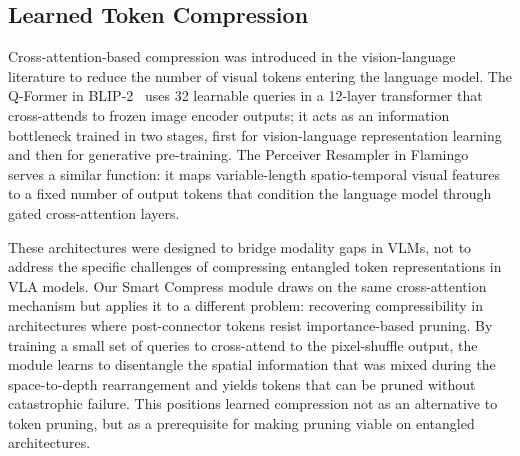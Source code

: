 \subsection{Learned Token Compression}

Cross-attention-based compression was introduced in the vision-language literature to reduce the number of visual tokens entering the language model. The Q-Former in BLIP-2~\cite{li2023blip2} uses 32 learnable queries in a 12-layer transformer that cross-attends to frozen image encoder outputs; it acts as an information bottleneck trained in two stages, first for vision-language representation learning and then for generative pre-training. The Perceiver Resampler in Flamingo~\cite{alayrac2022flamingo} serves a similar function: it maps variable-length spatio-temporal visual features to a fixed number of output tokens that condition the language model through gated cross-attention layers.

These architectures were designed to bridge modality gaps in VLMs, not to address the specific challenges of compressing entangled token representations in VLA models. Our Smart Compress module draws on the same cross-attention mechanism but applies it to a different problem: recovering compressibility in architectures where post-connector tokens resist importance-based pruning. By training a small set of queries to cross-attend to the pixel-shuffle output, the module learns to disentangle the spatial information that was mixed during the space-to-depth rearrangement and yields tokens that can be pruned without catastrophic failure. This positions learned compression not as an alternative to token pruning, but as a prerequisite for making pruning viable on entangled architectures.
